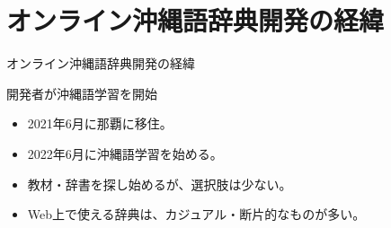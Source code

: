 \documentclass[14pt]{beamer}
\begin{document}
\section{オンライン沖縄語辞典開発の経緯}

\begin{frame}{オンライン沖縄語辞典開発の経緯}
  \begin{block}{開発者が沖縄語学習を開始}
    \begin{itemize}
    \item  2021年6月に那覇に移住。
    \item  2022年6月に沖縄語学習を始める。
    \item  教材・辞書を探し始めるが、選択肢は少ない。
    \item  Web上で使える辞典は、カジュアル・断片的なものが多い。
    \end{itemize}
  \end{block}
\end{frame}


    
\end{document}
